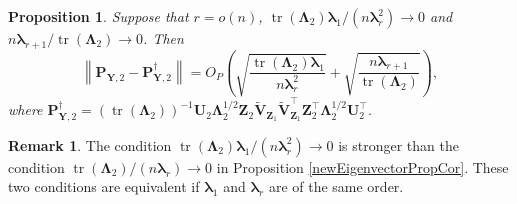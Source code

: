 \documentclass[12pt]{article} %
\DeclareMathOperator{\mytr}{tr}
\newcommand{\bZ}{\mathbf{Z}}
\newcommand{\bP}{\mathbf{P}}
\newcommand{\bY}{\mathbf{Y}}
\newcommand{\bU}{\mathbf{U}}
\newcommand{\bV}{\mathbf{V}}
\newcommand{\bfsym}[1]{\ensuremath{\boldsymbol{#1}}}
\def\blambda {\bfsym {\lambda}}
\def\bLambda {\bfsym {\Lambda}}
\newtheorem{proposition}{Proposition}
\theoremstyle{definition}
\newtheorem{remark}{Remark}
\begin{document}
\begin{proposition}
    \label{eigenvectorprop3}
    Suppose that $r=o(n)$, $\mytr(\bLambda_2)\blambda_1/(n\blambda_r^2)\to 0$ and $n\blambda_{r+1} /\mytr(\bLambda_2)\to 0$. Then
    \begin{equation*}
            \left\|\bP_{\bY,2}-
            \bP_{\bY,2}^{\dagger}
            \right\|
    = 
    O_P\left(
        \sqrt{\frac{\mytr(\bLambda_2) \blambda_1}{n\blambda_r^2}}
    +
    \sqrt{\frac{n\blambda_{r+1}}{\mytr(\bLambda_2)}}\right),
    \end{equation*}
    where $
            \bP_{\bY,2}^{\dagger}=
            \left(\mytr(\bLambda_2)\right)^{-1}
            \bU_2 \bLambda_2^{1/2}\bZ_{2} \tilde{\bV}_{\bZ_1}
            \tilde{\bV}_{\bZ_1}^\top \bZ_2^\top \bLambda_2^{1/2} \bU_2^\top
            $.
\end{proposition}
\begin{remark}
    The condition $\mytr(\bLambda_2)\blambda_1/(n\blambda_r^2)\to 0$ is stronger than the condition $\mytr(\bLambda_2)/(n\blambda_r)\to 0$ in Proposition \ref{newEigenvectorPropCor}.
    These two conditions are equivalent if $\blambda_1$ and $\blambda_r$ are of the same order.
\end{remark}
\end{document}
